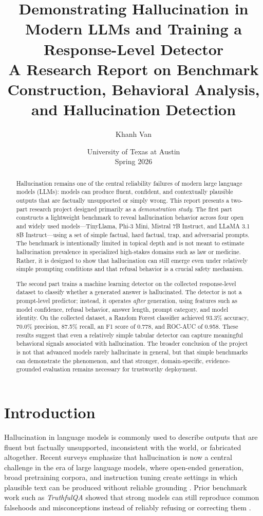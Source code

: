 \documentclass[11pt]{article}
\title{\textbf{Demonstrating Hallucination in Modern LLMs and Training a Response-Level Detector}\\
\vspace{0.75em}
\normalsize A Research Report on Benchmark Construction, Behavioral Analysis, and Hallucination Detection}
\author{Khanh Van}
\date{University of Texas at Austin\\Spring 2026}
\begin{document}
\maketitle
\onehalfspacing

\begin{abstract}
Hallucination remains one of the central reliability failures of modern large language models (LLMs): models can produce fluent, confident, and contextually plausible outputs that are factually unsupported or simply wrong. This report presents a two-part research project designed primarily as a \emph{demonstration study}. The first part constructs a lightweight benchmark to reveal hallucination behavior across four open and widely used models---TinyLlama, Phi-3 Mini, Mistral 7B Instruct, and LLaMA 3.1 8B Instruct---using a set of simple factual, hard factual, trap, and adversarial prompts. The benchmark is intentionally limited in topical depth and is not meant to estimate hallucination prevalence in specialized high-stakes domains such as law or medicine. Rather, it is designed to show that hallucination can still emerge even under relatively simple prompting conditions and that refusal behavior is a crucial safety mechanism.

The second part trains a machine learning detector on the collected response-level dataset to classify whether a generated answer is hallucinated. The detector is not a prompt-level predictor; instead, it operates \emph{after} generation, using features such as model confidence, refusal behavior, answer length, prompt category, and model identity. On the collected dataset, a Random Forest classifier achieved 93.3\% accuracy, 70.0\% precision, 87.5\% recall, an F1 score of 0.778, and ROC-AUC of 0.958. These results suggest that even a relatively simple tabular detector can capture meaningful behavioral signals associated with hallucination. The broader conclusion of the project is not that advanced models rarely hallucinate in general, but that simple benchmarks can demonstrate the phenomenon, and that stronger, domain-specific, evidence-grounded evaluation remains necessary for trustworthy deployment.
\end{abstract}
\newpage

\tableofcontents
\newpage

\section{Introduction}
Hallucination in language models is commonly used to describe outputs that are fluent but factually unsupported, inconsistent with the world, or fabricated altogether. Recent surveys emphasize that hallucination is now a central challenge in the era of large language models, where open-ended generation, broad pretraining corpora, and instruction tuning create settings in which plausible text can be produced without reliable grounding \cite{huang2023survey, rawte2023survey}. Prior benchmark work such as \textit{TruthfulQA} showed that strong models can still reproduce common falsehoods and misconceptions instead of reliably refusing or correcting them \cite{lin2022truthfulqa}.
\end{document}
